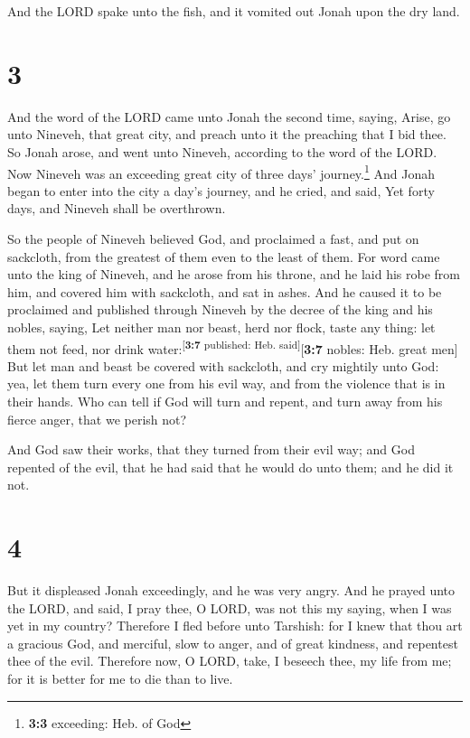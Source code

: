  And the LORD spake unto the fish, and it vomited out
Jonah upon the dry land.

\hypertarget{section-2}{%
\section{3}\label{section-2}}

 And the word of the LORD came unto Jonah the second time,
saying,  Arise, go unto Nineveh, that great city, and
preach unto it the preaching that I bid thee.  So Jonah
arose, and went unto Nineveh, according to the word of the LORD. Now
Nineveh was an exceeding great city of three days' journey.\footnote{\textbf{3:3}
  exceeding: Heb. of God}  And Jonah began to enter into
the city a day's journey, and he cried, and said, Yet forty days, and
Nineveh shall be overthrown.

 So the people of Nineveh believed God, and proclaimed a
fast, and put on sackcloth, from the greatest of them even to the least
of them.  For word came unto the king of Nineveh, and he
arose from his throne, and he laid his robe from him, and covered him
with sackcloth, and sat in ashes.  And he caused it to be
proclaimed and published through Nineveh by the decree of the king and
his nobles, saying, Let neither man nor beast, herd nor flock, taste any
thing: let them not feed, nor drink
water:\textsuperscript{{[}\textbf{3:7} published: Heb.
said{]}}{[}\textbf{3:7} nobles: Heb. great men{]}  But let
man and beast be covered with sackcloth, and cry mightily unto God: yea,
let them turn every one from his evil way, and from the violence that is
in their hands.  Who can tell if God will turn and repent,
and turn away from his fierce anger, that we perish not?

 And God saw their works, that they turned from their
evil way; and God repented of the evil, that he had said that he would
do unto them; and he did it not.

\hypertarget{section-3}{%
\section{4}\label{section-3}}

 But it displeased Jonah exceedingly, and he was very
angry.  And he prayed unto the LORD, and said, I pray
thee, O LORD, was not this my saying, when I was yet in my country?
Therefore I fled before unto Tarshish: for I knew that thou art a
gracious God, and merciful, slow to anger, and of great kindness, and
repentest thee of the evil.  Therefore now, O LORD, take,
I beseech thee, my life from me; for it is better for me to die than to
live.


